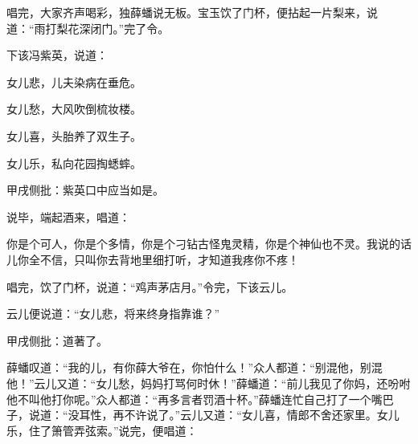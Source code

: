 \begin{parag}
    唱完，大家齐声喝彩，独薛蟠说无板。宝玉饮了门杯，便拈起一片梨来，说道：“雨打梨花深闭门。”完了令。
\end{parag}


\begin{parag}
    下该冯紫英，说道：
\end{parag}
\begin{poem}

    \begin{pl}

        女儿悲，儿夫染病在垂危。
    \end{pl}
    \begin{pl}

        女儿愁，大风吹倒梳妆楼。
    \end{pl}
    \begin{pl}

        女儿喜，头胎养了双生子。
    \end{pl}
    \begin{pl}

        女儿乐，私向花园掏蟋蟀。    \end{pl}\begin{note}甲戌侧批：紫英口中应当如是。\end{note}

\end{poem}


\begin{parag}
    说毕，端起酒来，唱道：
\end{parag}


\begin{poem}
    \begin{pl}
        你是个可人，你是个多情，你是个刁钻古怪鬼灵精，你是个神仙也不灵。我说的话儿你全不信，只叫你去背地里细打听，才知道我疼你不疼！
    \end{pl}
\end{poem}


\begin{parag}
    唱完，饮了门杯，说道：“鸡声茅店月。”令完，下该云儿。
\end{parag}


\begin{parag}
    云儿便说道：“女儿悲，将来终身指靠谁？”\begin{note}甲戌侧批：道著了。\end{note}薛蟠叹道：“我的儿，有你薛大爷在，你怕什么！”众人都道：“别混他，别混他！”云儿又道：“女儿愁，妈妈打骂何时休！”薛蟠道：“前儿我见了你妈，还吩咐他不叫他打你呢。”众人都道：“再多言者罚酒十杯。”薛蟠连忙自己打了一个嘴巴子，说道：“没耳性，再不许说了。”云儿又道：“女儿喜，情郎不舍还家里。女儿乐，住了箫管弄弦索。”说完，便唱道：
\end{parag}


